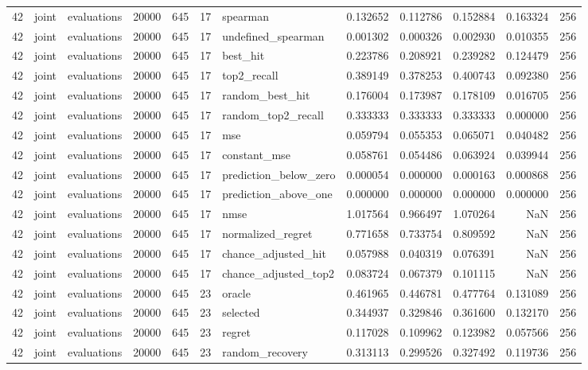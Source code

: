\begin{tabular}{rllrrrlrrrrr}
42 & joint & evaluations & 20000 & 645 & 17 & spearman & 0.132652 & 0.112786 & 0.152884 & 0.163324 & 256 \\
42 & joint & evaluations & 20000 & 645 & 17 & undefined_spearman & 0.001302 & 0.000326 & 0.002930 & 0.010355 & 256 \\
42 & joint & evaluations & 20000 & 645 & 17 & best_hit & 0.223786 & 0.208921 & 0.239282 & 0.124479 & 256 \\
42 & joint & evaluations & 20000 & 645 & 17 & top2_recall & 0.389149 & 0.378253 & 0.400743 & 0.092380 & 256 \\
42 & joint & evaluations & 20000 & 645 & 17 & random_best_hit & 0.176004 & 0.173987 & 0.178109 & 0.016705 & 256 \\
42 & joint & evaluations & 20000 & 645 & 17 & random_top2_recall & 0.333333 & 0.333333 & 0.333333 & 0.000000 & 256 \\
42 & joint & evaluations & 20000 & 645 & 17 & mse & 0.059794 & 0.055353 & 0.065071 & 0.040482 & 256 \\
42 & joint & evaluations & 20000 & 645 & 17 & constant_mse & 0.058761 & 0.054486 & 0.063924 & 0.039944 & 256 \\
42 & joint & evaluations & 20000 & 645 & 17 & prediction_below_zero & 0.000054 & 0.000000 & 0.000163 & 0.000868 & 256 \\
42 & joint & evaluations & 20000 & 645 & 17 & prediction_above_one & 0.000000 & 0.000000 & 0.000000 & 0.000000 & 256 \\
42 & joint & evaluations & 20000 & 645 & 17 & nmse & 1.017564 & 0.966497 & 1.070264 & NaN & 256 \\
42 & joint & evaluations & 20000 & 645 & 17 & normalized_regret & 0.771658 & 0.733754 & 0.809592 & NaN & 256 \\
42 & joint & evaluations & 20000 & 645 & 17 & chance_adjusted_hit & 0.057988 & 0.040319 & 0.076391 & NaN & 256 \\
42 & joint & evaluations & 20000 & 645 & 17 & chance_adjusted_top2 & 0.083724 & 0.067379 & 0.101115 & NaN & 256 \\
42 & joint & evaluations & 20000 & 645 & 23 & oracle & 0.461965 & 0.446781 & 0.477764 & 0.131089 & 256 \\
42 & joint & evaluations & 20000 & 645 & 23 & selected & 0.344937 & 0.329846 & 0.361600 & 0.132170 & 256 \\
42 & joint & evaluations & 20000 & 645 & 23 & regret & 0.117028 & 0.109962 & 0.123982 & 0.057566 & 256 \\
42 & joint & evaluations & 20000 & 645 & 23 & random_recovery & 0.313113 & 0.299526 & 0.327492 & 0.119736 & 256 \\

\end{tabular}
